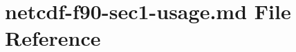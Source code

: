 \hypertarget{netcdf-f90-sec1-usage_8md}{}\section{netcdf-\/f90-\/sec1-\/usage.md File Reference}
\label{netcdf-f90-sec1-usage_8md}

